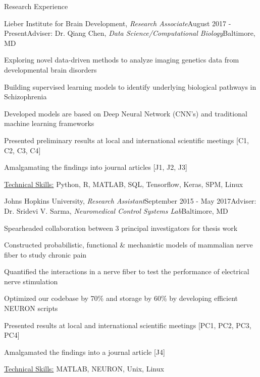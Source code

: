 \documentclass{resume}
\begin{document}
  \begin{rSection}{Research Experience}
\begin{rSubsection}{Lieber Institute for Brain Development, \textit{Research Associate}}{August 2017 - Present}{Adviser: Dr. Qiang Chen, \textit{Data Science/Computational Biology}}{Baltimore, MD}
\item Exploring novel data-driven methods to analyze imaging genetics data from developmental brain disorders
\item Building supervised learning models to identify underlying biological pathways in Schizophrenia
\item Developed models are based on Deep Neural Network (CNN's) and traditional machine learning frameworks
\item Presented preliminary results at local and international scientific meetings [C1, C2, C3, C4]
\item Amalgamating the findings into journal articles [J1, J2, J3] 
\item \uline{Technical Skills:} Python, R, MATLAB, SQL, Tensorflow, Keras, SPM, Linux
    \end{rSubsection}

    \begin{rSubsection}{Johns Hopkins University, \textit{Research Assistant}}{September 2015 - May 2017}{Adviser: Dr. Sridevi V. Sarma, \textit{Neuromedical Control Systems Lab}}{Baltimore, MD}
\item Spearheaded collaboration between 3 principal investigators for thesis work
\item Constructed probabilistic, functional \& mechanistic models of mammalian nerve fiber to study chronic pain
\item Quantified the interactions in a nerve fiber to test the performance of electrical nerve stimulation
\item Optimized our codebase by 70\% and storage by 60\% by developing efficient NEURON scripts
\item Presented results at local and international scientific meetings [PC1, PC2, PC3, PC4]
\item Amalgamated the findings into a journal article [J4]
\item \uline{Technical Skills:} MATLAB, NEURON, Unix, Linux
    \end{rSubsection}
  

\end{rSection}
\end{document}
